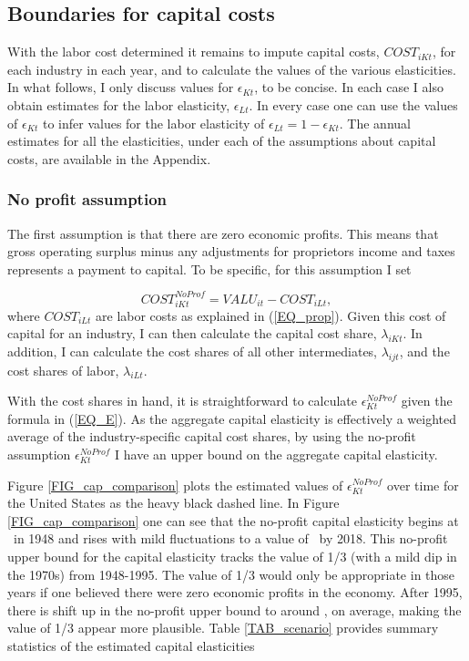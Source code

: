 \documentclass[11pt]{article}
\begin{document}
\subsection{Boundaries for capital costs}
With the labor cost determined it remains to impute capital costs, $COST_{iKt}$, for each industry in each year, and to calculate the values of the various elasticities. In what follows, I only discuss values for $\epsilon_{Kt}$, to be concise. In each case I also obtain estimates for the labor elasticity, $\epsilon_{Lt}$. In every case one can use the values of $\epsilon_{Kt}$ to infer values for the labor elasticity of $\epsilon_{Lt} = 1 - \epsilon_{Kt}$. The annual estimates for all the elasticities, under each of the assumptions about capital costs, are available in the Appendix.

\subsubsection{No profit assumption}
The first assumption is that there are zero economic profits. This means that gross operating surplus minus any adjustments for proprietors income and taxes represents a payment to capital. To be specific, for this assumption I set

\begin{equation}
	COST^{NoProf}_{iKt} = VALU_{it} - COST_{iLt},  \label{EQ_noprofit}
\end{equation}
where $COST_{iLt}$ are labor costs as explained in (\ref{EQ_prop}). Given this cost of capital for an industry, I can then calculate the capital cost share, $\lambda_{iKt}$. In addition, I can calculate the cost shares of all other intermediates, $\lambda_{ijt}$, and the cost shares of labor, $\lambda_{iLt}$.

With the cost shares in hand, it is straightforward to calculate $\epsilon_{Kt}^{NoProf}$ given the formula in (\ref{EQ_E}). As the aggregate capital elasticity is effectively a weighted average of the industry-specific capital cost shares, by using the no-profit assumption $\epsilon_{Kt}^{NoProf}$ I have an upper bound on the aggregate capital elasticity.

Figure \ref{FIG_cap_comparison} plots the estimated values of $\epsilon_{Kt}^{NoProf}$ over time for the United States as the heavy black dashed line. In Figure \ref{FIG_cap_comparison} one can see that the no-profit capital elasticity begins at \basefirstnoprofit \ in 1948 and rises with mild fluctuations to a value of \baselastnoprofit \ by 2018. This no-profit upper bound for the capital elasticity tracks the value of 1/3 (with a mild dip in the 1970s) from 1948-1995. The value of 1/3 would only be appropriate in those years if one believed there were zero economic profits in the economy. After 1995, there is shift up in the no-profit upper bound to around \baselatenoprofit, on average, making the value of 1/3 appear more plausible. Table \ref{TAB_scenario} provides summary statistics of the estimated capital elasticities
\end{document}
